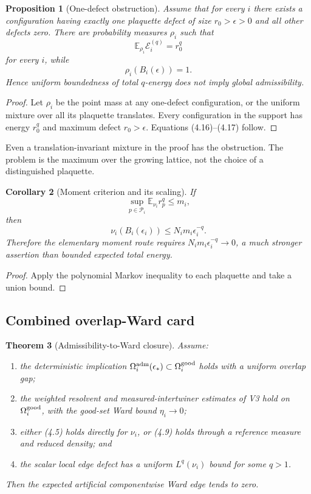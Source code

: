 \documentclass[11pt]{article}
\newtheorem{theorem}{Theorem}[section]
\newtheorem{proposition}[theorem]{Proposition}
\newtheorem{corollary}[theorem]{Corollary}
\begin{document}
\begin{proposition}[One-defect obstruction]
\label{prop:v11v4-one-defect}
Assume that for every \(i\) there exists a configuration having exactly one
plaquette defect of size \(r_0>\epsilon>0\) and all other defects zero.
There are probability measures \(\rho_i\) such that
\[
 \mathbb E_{\rho_i}\mathcal E_i^{(q)}=r_0^q
 \tag{4.16}
\]
for every \(i\), while
\[
 \rho_i(B_i(\epsilon))=1.
 \tag{4.17}
\]
Hence uniform boundedness of total \(q\)-energy does not imply global
admissibility.
\end{proposition}

\begin{proof}
Let \(\rho_i\) be the point mass at any one-defect configuration, or the
uniform mixture over all its plaquette translates.  Every configuration
in the support has energy \(r_0^q\) and maximum defect \(r_0>\epsilon\).
Equations (4.16)--(4.17) follow.
\end{proof}

Even a translation-invariant mixture in the proof has the obstruction.
The problem is the maximum over the growing lattice, not the choice of a
distinguished plaquette.

\begin{corollary}[Moment criterion and its scaling]
\label{cor:v11v4-moment}
If
\[
 \sup_{p\in\mathcal P_i}\mathbb E_{\nu_i}r_p^q\leq m_i,
 \tag{4.18}
\]
then
\[
 \nu_i(B_i(\epsilon_i))\leq
 N_i m_i\epsilon_i^{-q}.
 \tag{4.19}
\]
Therefore the elementary moment route requires
\(N_im_i\epsilon_i^{-q}\to0\), a much stronger assertion than bounded
expected total energy.
\end{corollary}

\begin{proof}
Apply the polynomial Markov inequality to each plaquette and take a union
bound.
\end{proof}

\subsection{Combined overlap-Ward card}

\begin{theorem}[Admissibility-to-Ward closure]
\label{thm:v11v4-overlap-ward}
Assume:
\begin{enumerate}[label=\textnormal{(\roman*)}]
\item the deterministic implication
\(\Omega_i^{\rm adm}(\epsilon_*)\subset\Omega_i^{\rm good}\) holds with a
uniform overlap gap;
\item the weighted resolvent and measured-intertwiner estimates of V3 hold
on \(\Omega_i^{\rm good}\), with the good-set Ward bound
\(\eta_i\to0\);
\item either (4.5) holds directly for \(\nu_i\), or (4.9) holds through a
reference measure and reduced density; and
\item the scalar local edge defect has a uniform \(L^q(\nu_i)\) bound for
some \(q>1\).
\end{enumerate}
Then the expected artificial componentwise Ward edge tends to zero.
\end{theorem}
\end{document}

